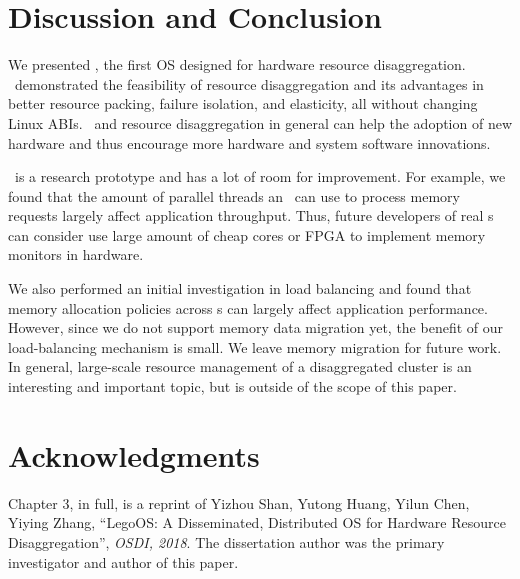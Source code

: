 \section{Discussion and Conclusion}
\label{sec:lego:conclude}

We presented \lego, the first OS designed for hardware resource disaggregation.
\lego\ demonstrated the feasibility of resource disaggregation and its advantages in 
better resource packing, failure isolation, and elasticity, all without changing Linux ABIs.
\lego\ and resource disaggregation in general can help the adoption of new hardware
and thus encourage more hardware and system software innovations.  

\lego\ is a research prototype and has a lot of room for improvement.
For example, we found that the amount of parallel threads an \mcomponent\ can 
use to process memory requests largely affect application throughput. 
Thus, future developers of real \mcomponent{}s can consider use 
large amount of cheap cores or FPGA to implement memory monitors in hardware.

We also performed an initial investigation in load balancing 
and found that memory allocation policies across \mcomponent{}s can largely affect application performance.
However, since we do not support memory data migration yet, 
the benefit of our load-balancing mechanism is small.
We leave memory migration for future work.
In general, large-scale resource management of a disaggregated cluster is 
an interesting and important topic, but is outside of the scope of this paper.

\section{Acknowledgments}

Chapter 3, in full, is a reprint of Yizhou Shan, Yutong Huang, Yilun Chen, Yiying Zhang, ``LegoOS: A Disseminated, Distributed OS for Hardware Resource Disaggregation'', \textit{OSDI, 2018}. The dissertation author was the primary investigator and author of this paper.